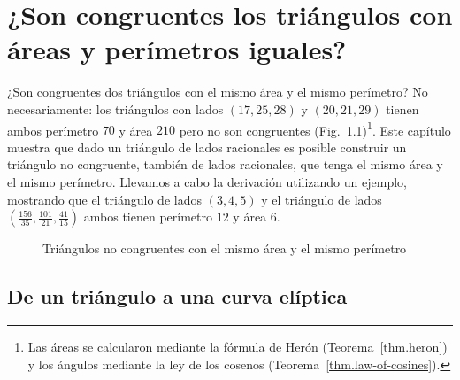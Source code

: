 
\chapter[Los triángulos con áreas y perímetros iguales?]
{¿Son congruentes los triángulos con áreas y perímetros iguales?}\label{c.congruent}


¿Son congruentes dos triángulos con el mismo área y el mismo perímetro? No necesariamente: los triángulos con lados $(17,25,28)$ y $(20,21,29)$ tienen ambos perímetro $70$ y área $210$ pero no son congruentes (Fig.~\ref{f.congruent-first-example})\footnote{Las áreas se calcularon mediante la fórmula de Herón (Teorema~\ref{thm.heron}) y los ángulos mediante la ley de los cosenos (Teorema~\ref{thm.law-of-cosines}).}. Este capítulo muestra que dado un triángulo de lados racionales es posible construir un triángulo no congruente, también de lados racionales, que tenga el mismo área y el mismo perímetro.
Llevamos a cabo la derivación utilizando un ejemplo, mostrando que el triángulo de lados $(3,4,5)$ y el triángulo de lados 
$\left(\frac{156}{35}, \frac{101}{21}, \frac{41}{15}\right)$ ambos tienen  perímetro $12$ y área $6$.

\begin{figure}[b]
\begin{center}
\end{center}
\caption{Triángulos no congruentes con el mismo área y el mismo perímetro}\label{f.congruent-first-example}
\end{figure}

\section{De un triángulo a una curva elíptica}\label{s.elliptic}

